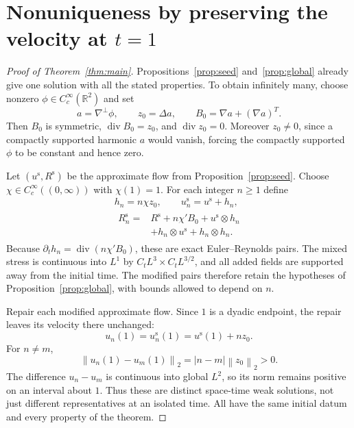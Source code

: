 \documentclass[11pt,a4paper,reqno]{amsart}
\theoremstyle{plain}
\theoremstyle{definition}
\theoremstyle{remark}
\numberwithin{equation}{section}
\newcommand{\R}{\mathbb R}
\newcommand{\Div}{\operatorname{div}}
\newcommand{\norm}[2]{\left\|#1\right\|_{#2}}
\begin{document}
\section{Nonuniqueness by preserving the velocity at \texorpdfstring{$t=1$}{t = 1}}\label{sec:nonuniqueness}

\begin{proof}[Proof of Theorem~\ref{thm:main}]
Propositions~\ref{prop:seed} and~\ref{prop:global} already give one
solution with all the stated properties. To obtain infinitely many,
choose nonzero $\phi\in C_c^\infty(\R^2)$ and set
\[
 a=\nabla^\perp\phi,\qquad z_0=\Delta a,\qquad
 B_0=\nabla a+(\nabla a)^T.
\]
Then $B_0$ is symmetric, $\Div B_0=z_0$, and $\Div z_0=0$.
Moreover $z_0\ne0$, since a compactly supported harmonic $a$ would
vanish, forcing the compactly supported $\phi$ to be constant and
hence zero.

Let $(u^{\mathrm s},R^{\mathrm s})$ be the approximate flow from
Proposition~\ref{prop:seed}. Choose
$\chi\in C_c^\infty((0,\infty))$ with $\chi(1)=1$. For each integer
$n\ge1$ define
\begin{equation}\label{eq:modified-seeds}
 \begin{gathered}
 h_n=n\chi z_0,\qquad u_n^{\mathrm s}=u^{\mathrm s}+h_n,\\
 \begin{aligned}
 R_n^{\mathrm s}={}&R^{\mathrm s}+n\chi'B_0
                    +u^{\mathrm s}\otimes h_n\\
                  &+h_n\otimes u^{\mathrm s}+h_n\otimes h_n.
 \end{aligned}
 \end{gathered}
\end{equation}
Because $\partial_th_n=\Div(n\chi'B_0)$, these are exact
Euler--Reynolds pairs. The mixed stress is continuous into $L^1$ by
$C_tL^3\times C_tL^{3/2}$, and all added fields are supported away
from the initial time. The modified pairs therefore retain the
hypotheses of Proposition~\ref{prop:global}, with bounds allowed to
depend on $n$.

Repair each modified approximate flow. Since $1$ is a dyadic
endpoint, the repair leaves its velocity there unchanged:
\[
 u_n(1)=u_n^{\mathrm s}(1)=u^{\mathrm s}(1)+nz_0.
\]
For $n\ne m$,
\begin{equation}\label{eq:exact-separation}
 \norm{u_n(1)-u_m(1)}2=|n-m|\norm{z_0}2>0.
\end{equation}
The difference $u_n-u_m$ is continuous into global $L^2$, so its norm
remains positive on an interval about $1$. Thus these are distinct
space-time weak solutions, not just different representatives at an
isolated time. All have the same initial datum and every property of
the theorem.
\end{proof}
\end{document}
